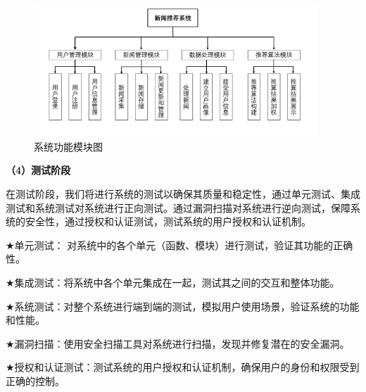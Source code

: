 \documentclass[withoutpreface,bwprint]{cumcmthesis} %
\begin{document}
	\begin{figure}[H]
		\centering
		\includegraphics[width=0.95\textwidth]{系统功能模块图}
		\caption{系统功能模块图}
		\label{fig:circuit-diagcam}
	\end{figure}
	\textbf{（4）测试阶段}\par
	在测试阶段，我们将进行系统的测试以确保其质量和稳定性，通过单元测试、集成测试和系统测试对系统进行正向测试。通过漏洞扫描对系统进行逆向测试，保障系统的安全性，通过授权和认证测试，测试系统的用户授权和认证机制。\par
	$\bigstar$单元测试： 对系统中的各个单元（函数、模块）进行测试，验证其功能的正确性。\par
	$\bigstar$集成测试：将系统中各个单元集成在一起，测试其之间的交互和整体功能。\par
	$\bigstar$系统测试：对整个系统进行端到端的测试，模拟用户使用场景，验证系统的功能和性能。\par
	$\bigstar$漏洞扫描：使用安全扫描工具对系统进行扫描，发现并修复潜在的安全漏洞。\par
	$\bigstar$授权和认证测试：测试系统的用户授权和认证机制，确保用户的身份和权限受到正确的控制。
\end{document}
